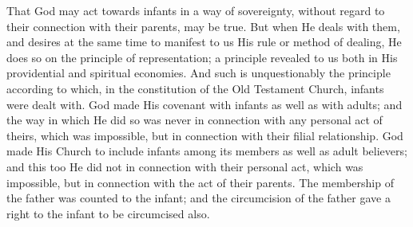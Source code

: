 \documentclass[]{book}
\begin{document}
That God may act towards infants in a way of sovereignty, without regard to their connection with their parents, may be true. But when He deals with them, and desires at the same time to manifest to us His rule or method of dealing, He does so on the principle of representation; a principle revealed to us both in His providential and spiritual economies. And such is unquestionably the principle according to which, in the constitution of the Old Testament Church, infants were dealt with. God made His covenant with infants as well as with adults; and the way in which He did so was never in connection with any personal act of theirs, which was impossible, but in connection with their filial relationship. God made His Church to include infants among its members as well as adult believers; and this too He did not in connection with their personal act, which was impossible, but in connection with the act of their parents. The membership of the father was counted to the infant; and the circumcision of the father gave a right to the infant to be circumcised also.
\end{document}

